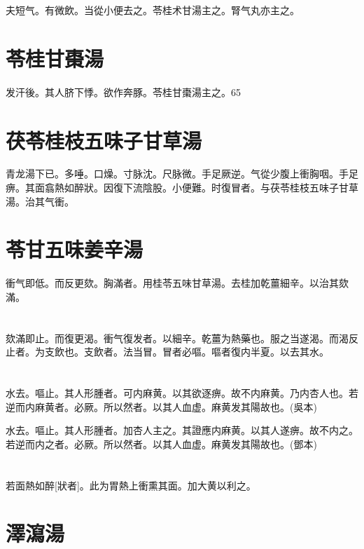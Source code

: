 \documentclass[12pt,oneside,UTF8,b5paper]{ctexbook}她她她她她她她
\begin{document}
夫短气。有微飲。当從小便去之。苓桂术甘湯主之。腎气丸亦主之。

\section{苓桂甘棗湯}

发汗後。其人脐下悸。欲作奔豚。苓桂甘棗湯主之。65

\section{茯苓桂枝五味子甘草湯}

青龙湯下已。多唾。口燥。寸脉沈。尺脉微。手足厥逆。气從少腹上衝胸咽。手足痹。其面翕熱如醉狀。因復下流陰股。小便難。时復冒者。与茯苓桂枝五味子甘草湯。治其气衝。

\section{苓甘五味姜辛湯}

衝气即低。而反更欬。胸滿者。用桂苓五味甘草湯。去桂加乾薑細辛。以治其欬滿。

\section{}

欬滿即止。而復更渴。衝气復发者。以細辛。乾薑为熱藥也。服之当遂渴。而渴反止者。为支飲也。支飲者。法当冒。冒者必嘔。嘔者復内半夏。以去其水。

\section{}

水去。嘔止。其人形腫者。可内麻黄。以其欲逐痹。故不内麻黄。乃内杏人也。若逆而内麻黄者。必厥。所以然者。以其人血虚。麻黄发其陽故也。(吳本)

水去。嘔止。其人形腫者。加杏人主之。其證應内麻黄。以其人遂痹。故不内之。若逆而内之者。必厥。所以然者。以其人血虚。麻黄发其陽故也。(鄧本)

\section{}

若面熱如醉[狀者]。此为胃熱上衝熏其面。加大黄以利之。

\section{澤瀉湯}
\end{document}
